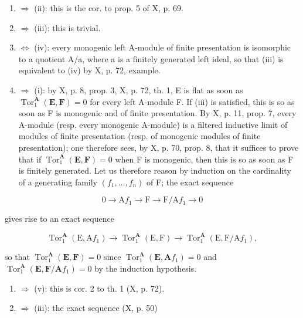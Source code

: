 \begin{enumerate}
\def\labelenumi{(\roman{enumi})}
\item
  \(\Rightarrow\) (ii): this is the cor. to prop. 5 of X, p. 69.
\item
  \(\Rightarrow\) (iii): this is trivial.
\item
  \(\Leftrightarrow\) (iv): every monogenic left A-module of finite presentation is isomorphic to a quotient A/a, where a is a finitely generated left ideal, so that (iii) is equivalent to (iv) by X, p. 72, example.
\item
  \(\Rightarrow\) (i): by X, p. 8, prop. 3, X, p. 72, th. 1, E is flat as soon as \(\operatorname{Tor}_{1}^{\mathbf{A}}(\mathbf{E},\mathbf{F}) = 0\) for every left A-module F. If (iii) is satisfied, this is so as soon as F is monogenic and of finite presentation. By X, p. 11, prop. 7, every A-module (resp. every monogenic A-module) is a filtered inductive limit of modules of finite presentation (resp. of monogenic modules of finite presentation); one therefore sees, by X, p. 70, prop. 8, that it suffices to prove that if \(\operatorname{Tor}_{1}^{\mathbf{A}}(\mathbf{E},\mathbf{F}) = 0\) when F is monogenic, then this is so as soon as F is finitely generated. Let us therefore reason by induction on the cardinality of a generating family \((f_{1},\ldots,f_{n})\) of F; the exact sequence
\end{enumerate}

\[
0 \rightarrow \mathrm{A} f _ {1} \rightarrow \mathrm{F} \rightarrow \mathrm{F} / \mathrm{A} f _ {1} \rightarrow 0
\]

gives rise to an exact sequence

\[
\operatorname{Tor} _ {1} ^ {\mathbf {A}} (\mathrm{E}, \mathrm{A} f _ {1}) \rightarrow \operatorname{Tor} _ {1} ^ {\mathbf {A}} (\mathrm{E}, \mathrm{F}) \rightarrow \operatorname{Tor} _ {1} ^ {\mathbf {A}} (\mathrm{E}, \mathrm{F} / \mathrm{A} f _ {1}),
\]

so that \(\operatorname{Tor}_{1}^{\mathbf{A}}(\mathbf{E},\mathbf{F})=0\) since \(\operatorname{Tor}_{1}^{\mathbf{A}}(\mathbf{E},\mathbf{A}f_{1})=0\) and \(\operatorname{Tor}_{1}^{\mathbf{A}}(\mathbf{E},\mathbf{F}/\mathbf{A}f_{1})=0\) by the induction hypothesis.

\begin{enumerate}
\def\labelenumi{(\roman{enumi})}
\item
  \(\Rightarrow\) (v): this is cor. 2 to th. 1 (X, p. 72).
\item
  \(\Rightarrow\) (iii): the exact sequence (X, p. 50)
\end{enumerate}


